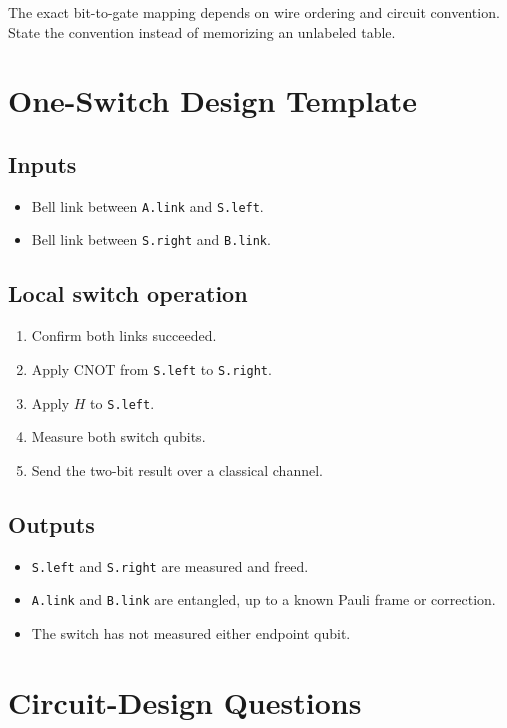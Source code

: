 \documentclass[11pt]{article}
\begin{document}
The exact bit-to-gate mapping depends on wire ordering and circuit convention. State the convention instead of memorizing an unlabeled table.

\section{One-Switch Design Template}

\subsection{Inputs}

\begin{itemize}
    \item Bell link between \texttt{A.link} and \texttt{S.left}.
    \item Bell link between \texttt{S.right} and \texttt{B.link}.
\end{itemize}

\subsection{Local switch operation}

\begin{enumerate}
    \item Confirm both links succeeded.
    \item Apply CNOT from \texttt{S.left} to \texttt{S.right}.
    \item Apply \(H\) to \texttt{S.left}.
    \item Measure both switch qubits.
    \item Send the two-bit result over a classical channel.
\end{enumerate}

\subsection{Outputs}

\begin{itemize}
    \item \texttt{S.left} and \texttt{S.right} are measured and freed.
    \item \texttt{A.link} and \texttt{B.link} are entangled, up to a known Pauli frame or correction.
    \item The switch has not measured either endpoint qubit.
\end{itemize}

\section{Circuit-Design Questions}
\end{document}

